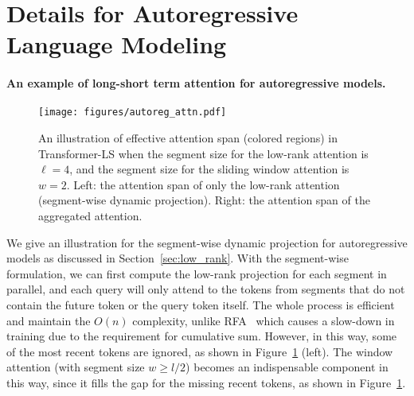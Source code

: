\section{Details for Autoregressive Language Modeling}
\label{appendix:lm_params}
\paragraph{An example of long-short term attention for autoregressive models.}
\begin{figure}
\begin{center}
    \texttt{[image: figures/autoreg\_attn.pdf]}
\end{center}
\caption{An illustration of effective attention span (colored regions) in Transformer-LS when the segment size for the low-rank attention is $\ell=4$, and the segment size for the sliding window attention is $w=2$. Left: the attention span of only the low-rank attention (segment-wise dynamic projection). Right: the attention span of the aggregated attention. }
\label{fig:autoreg_seg}
\end{figure}
We give an illustration for the segment-wise dynamic projection for autoregressive models as discussed in Section~\ref{sec:low_rank}. With the segment-wise formulation, we can first compute the low-rank projection for each segment in parallel, and each query will only attend to the tokens from segments that do not contain the future token or the query token itself. The whole process is efficient and maintain the $O(n)$ complexity, unlike RFA~\citep{peng2021random} which causes a slow-down in training due to the requirement for cumulative sum. However, in this way, some of the most recent tokens are ignored, as shown in Figure~\ref{fig:autoreg_seg} (left). The window attention (with segment size $w\ge l/2$) becomes an indispensable component in this way, since it fills the gap for the missing recent tokens, as shown in Figure~\ref{fig:autoreg_seg}.

